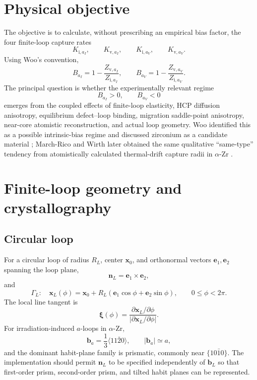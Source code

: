 \documentclass[11pt]{article}
\newcommand{\ii}{\mathrm i}
\newcommand{\vv}{\mathrm v}
\newcommand{\bx}{\bm{x}}
\newcommand{\bn}{\bm{n}}
\newcommand{\bb}{\bm{b}}
\newcommand{\bxi}{\bm{\xi}}
\newcommand{\cG}{\Gamma}
\begin{document}
\section{Physical objective}
The objective is to calculate, without prescribing an empirical bias factor, the four finite-loop capture rates
\begin{equation}
K_{\ii,a_I},\qquad K_{\vv,a_I},\qquad K_{\ii,a_V},\qquad K_{\vv,a_V}.
\end{equation}
Using Woo's convention,
\begin{equation}
B_{a_I}=1-\frac{Z_{\vv,a_I}}{Z_{\ii,a_I}},\qquad
B_{a_V}=1-\frac{Z_{\vv,a_V}}{Z_{\ii,a_V}}.
\end{equation}
The principal question is whether the experimentally relevant regime
\begin{equation}
\boxed{B_{a_I}>0,\qquad B_{a_V}<0}
\end{equation}
emerges from the coupled effects of finite-loop elasticity, HCP diffusion anisotropy, equilibrium defect--loop binding, migration saddle-point anisotropy, near-core atomistic reconstruction, and actual loop geometry. Woo identified this as a possible intrinsic-bias regime and discussed zirconium as a candidate material \cite{Woo1982}; March-Rico and Wirth later obtained the same qualitative ``same-type'' tendency from atomistically calculated thermal-drift capture radii in $\alpha$-Zr \cite{MarchRicoWirth2023}.

\section{Finite-loop geometry and crystallography}
\subsection{Circular loop}
For a circular loop of radius $R_L$, center $\bx_0$, and orthonormal vectors $\bm e_1,\bm e_2$ spanning the loop plane,
\begin{equation}
\bn_L=\bm e_1\times\bm e_2,
\end{equation}
and
\begin{equation}
\cG_L:\quad \bx_L(\phi)=\bx_0+R_L(\bm e_1\cos\phi+\bm e_2\sin\phi),\qquad 0\le\phi<2\pi.
\end{equation}
The local line tangent is
\begin{equation}
\bxi(\phi)=\frac{\partial\bx_L/\partial\phi}{|\partial\bx_L/\partial\phi|}.
\end{equation}
For irradiation-induced $a$-loops in $\alpha$-Zr,
\begin{equation}
\bb_a=\frac13\langle11\bar20\rangle,\qquad |\bb_a|\simeq a,
\end{equation}
and the dominant habit-plane family is prismatic, commonly near $\{10\bar10\}$. The implementation should permit $\bn_L$ to be specified independently of $\bb_L$ so that first-order prism, second-order prism, and tilted habit planes can be represented.
\end{document}
